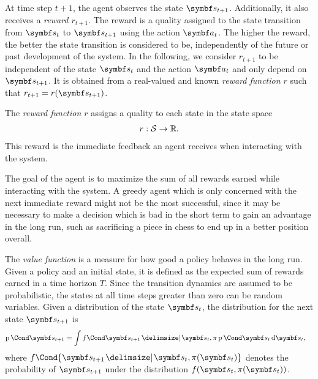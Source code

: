 At time step $t+1$, the agent observes the state $\mat{s}_{t+1}$.
Additionally, it also receives a \emph{reward $r_{t+1}$}.
The reward is a quality assigned to the state transition from $\mat{s}_t$ to $\mat{s}_{t+1}$ using the action $\mat{a}_t$.
The higher the reward, the better the state transition is considered to be, independently of the future or past development of the system.
In the following, we consider $r_{t+1}$ to be independent of the state $\mat{s}_t$ and the action $\mat{a}_t$ and only depend on $\mat{s}_{t+1}$.
It is obtained from a real-valued and known \emph{reward function $r$} such that $r_{t+1} = r(\mat{s}_{t+1})$.
\begin{definition}
    \label{def:reinforcement_learning:reward_function}
    The \emph{reward function $r$} assigns a quality to each state in the state space
    \begin{align}
        r : \mathcal{S} \to \mathbb{R}.
    \end{align}
    This reward is the immediate feedback an agent receives when interacting with the system.
\end{definition}

The goal of the agent is to maximize the sum of all rewards earned while interacting with the system.
A greedy agent which is only concerned with the next immediate reward might not be the most successful, since it may be necessary to make a decision which is bad in the short term to gain an advantage in the long run, such as sacrificing a piece in chess to end up in a better position overall.

The \emph{value function} is a measure for how good a policy behaves in the long run.
Given a policy and an initial state, it is defined as the expected sum of rewards earned in a time horizon $T$.
Since the transition dynamics are assumed to be probabilistic, the states at all time steps greater than zero can be random variables.
Given a distribution of the state $\mat{s_t}$, the distribution for the next state $\mat{s_{t+1}}$ is
\begin{align}
    \Prob{\mat{s_{t+1}}} &= \int \Fun{f}{\mat{s_{t+1}} \given \mat{s_t}, \pi}\Prob{\mat{s_t}} \diff \mat{s_t},
\end{align}
where $f\Cond{\mat{s_{t+1}} \given \mat{s_t}, \pi(\mat{s_t})}$ denotes the probability of $\mat{s_{t+1}}$ under the distribution $f(\mat{s_t}, \pi(\mat{s_t}))$.

